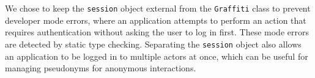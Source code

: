 We chose to keep the \texttt{session} object external from the \texttt{Graffiti} class
to prevent developer mode errors, where an application attempts to perform an action
that requires authentication without asking the user to log in first.
These mode errors are detected by static type checking.
Separating the \texttt{session} object also allows an application to be logged in to
multiple actors at once, which can be useful for managing pseudonyms for anonymous interactions.








